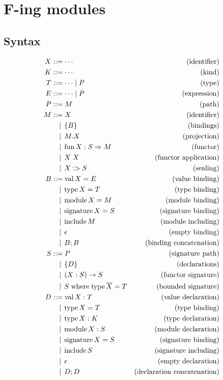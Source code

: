 \section{F-ing modules}

\cite{Rossberg:2014}

\subsection{Syntax}

\begin{align*}
  X &\BNFassign \cdots &(\text{identifier}) \\
  K &\BNFassign \cdots &(\text{kind}) \\
  T &\BNFassign \cdots \mid P &(\text{type}) \\
  E &\BNFassign \cdots \mid P &(\text{expression}) \\
  P &\BNFassign M &(\text{path}) \\
  M
  &\BNFassign X &(\text{identifier}) \\
  &\BNFor \{ B \} &(\text{bindings}) \\
  &\BNFor M.X &(\text{projection}) \\
  &\BNFor \symfun X: S \Rightarrow M &(\text{functor}) \\
  &\BNFor X\; X &(\text{functor application}) \\
  &\BNFor X :> S &(\text{sealing}) \\
  B
  &\BNFassign \symval X = E &(\text{value binding}) \\
  &\BNFor \symtype X = T &(\text{type binding}) \\
  &\BNFor \symmodule X = M &(\text{module binding}) \\
  &\BNFor \symsignature X = S &(\text{signature binding}) \\
  &\BNFor \syminclude M &(\text{module including}) \\
  &\BNFor \epsilon &(\text{empty binding}) \\
  &\BNFor B; B &(\text{binding concatenation}) \\
  S
  &\BNFassign P &(\text{signature path}) \\
  &\BNFor \{ D \} &(\text{declarations}) \\
  &\BNFor (X: S) \to S &(\text{functor signature}) \\
  &\BNFor S \symwhere \symtype \overline{X} = T &(\text{bounded signature}) \\
  D
  &\BNFassign \symval X: T &(\text{value declaration}) \\
  &\BNFor \symtype X = T &(\text{type binding}) \\
  &\BNFor \symtype X: K &(\text{type declaration}) \\
  &\BNFor \symmodule X: S &(\text{module declaration}) \\
  &\BNFor \symsignature X = S &(\text{signature binding}) \\
  &\BNFor \syminclude S &(\text{signature including}) \\
  &\BNFor \epsilon &(\text{empty declaration}) \\
  &\BNFor D; D &(\text{declaration concatenation})
\end{align*}

